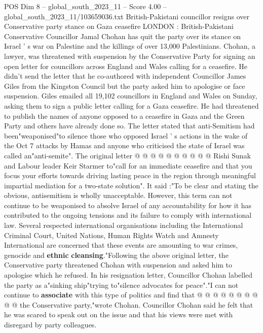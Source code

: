 \begin{textsample}{POS Dim 8 – global\_south\_2023\_11 – Score 4.00 – global\_south\_2023\_11/103659036.txt}  \label{ex:f8_pos_367}
British-Pakistani councillor resigns over Conservative party stance on Gaza ceasefire LONDON : British-Pakistani Conservative Councillor Jamal Chohan has quit the party over its stance on Israel ' s war on Palestine and the killings of over 13,000 Palestinians.
Chohan, a lawyer, was threatened with suspension by the Conservative Party for signing an open letter for councillors across England and Wales calling for a ceasefire.
He didn't send the letter that he co-authored with independent Councillor James Giles from the Kingston Council but the party asked him to apologise or face suspension.
Giles emailed all 19,102 councillors in England and Wales on Sunday, asking them to sign a public letter calling for a Gaza ceasefire.
He had threatened to publish the names of anyone opposed to a ceasefire in Gaza and the Green Party and others have already done so.
The letter stated that anti-Semitism had been"weaponised"to silence those who opposed Israel ' s actions in the wake of the Oct 7 attacks by Hamas and anyone who criticised the state of Israel was called an"anti-semite".
The original letter @ @ @ @ @ @ @ @ @ @ Rishi Sunak and Labour leader Keir Starmer to"call for an immediate ceasefire and that you focus your efforts towards driving lasting peace in the region through meaningful impartial mediation for a two-state solution".
It said :"To be clear and stating the obvious, antisemitism is wholly unacceptable.
However, this term can not continue to be weaponised to absolve Israel of any accountability for how it has contributed to the ongoing tensions and its failure to comply with international law.
Several respected international organisations including the International Criminal Court, United Nations, Human Rights Watch and Amnesty International are concerned that these events are amounting to war crimes, genocide and \textbf{ethnic} \textbf{cleansing}."Following the above original letter, the Conservative party threatened Chohan with suspension and asked him to apologise which he refused.
In his resignation letter, Councillor Chohan labelled the party as a"sinking ship"trying to"silence advocates for peace"."I can not continue to \textbf{associate} with this type of politics and find that @ @ @ @ @ @ @ @ @ @ the Conservative party,"wrote Chohan.
Councillor Chohan said he felt that he was scared to speak out on the issue and that his views were met with disregard by party colleagues.

\end{textsample}
